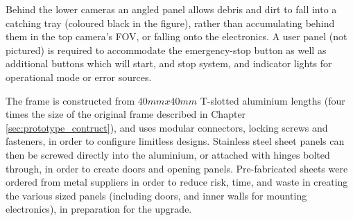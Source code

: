\documentclass[fleqn,twoside,12pt]{report}
\begin{document}
Behind the lower cameras an angled panel allows debris and dirt to fall into a catching tray (coloured black in the figure), rather than accumulating behind them in the top camera's FOV, or falling onto the electronics. A user panel (not pictured) is required to accommodate the emergency-stop button as well as additional buttons which will start, and stop system, and indicator lights for operational mode or error sources.


The frame is constructed from $40mmx40mm$ T-slotted aluminium lengths (four times the size of the original frame described in Chapter \ref{sec:prototype_contruct}), and uses modular connectors, locking screws and fasteners, in order to configure limitless designs. Stainless steel sheet panels can then be screwed directly into the aluminium, or attached with hinges bolted through, in order to create doors and opening panels. Pre-fabricated sheets were ordered from metal suppliers in order to reduce risk, time, and waste in creating the various sized panels (including doors, and inner walls for mounting electronics), in preparation for the upgrade.
\end{document}
